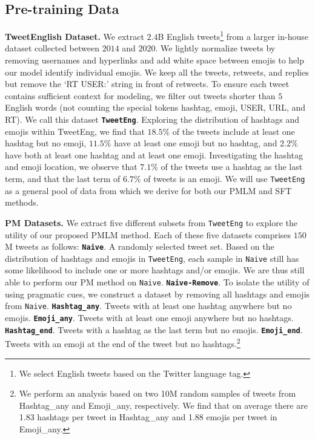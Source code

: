 \subsection{Pre-training Data}
\noindent \textbf{TweetEnglish Dataset.}
We extract $2.4$B English tweets\footnote{We select English tweets based on the Twitter language tag.} from a larger in-house dataset collected between $2014$ and $2020$. We lightly normalize tweets by removing usernames and hyperlinks and add white space between emojis to help our model identify individual emojis. We keep all the tweets, retweets, and replies but remove the `RT USER:' string in front of retweets. To ensure each tweet contains sufficient context for modeling, we filter out tweets shorter than $5$ English words (not counting the special tokens hashtag, emoji, USER, URL, and RT). We call this dataset \textbf{\texttt{TweetEng}}. Exploring the distribution of hashtags and emojis within TweetEng, we find that $18.5$\% of the tweets include at least one hashtag but no emoji, $11.5$\% have at least one emoji but no hashtag, and $2.2$\% have both at least one hashtag and at least one emoji. Investigating the hashtag and emoji location, we observe that $7.1$\% of the tweets use a hashtag as the last term, and that the last term of $6.7$\% of tweets is an emoji. We will use \texttt{TweetEng} as a general pool of data from which we derive for both our PMLM and SFT methods. 

\textbf{PM Datasets.}\label{subsec:prag_masking:data}
We extract five different subsets from \texttt{TweetEng} to explore the utility of our proposed PMLM method. Each of these five datasets comprises $150$M tweets as follows:
\texttt{\textbf{Naive}}. A randomly selected tweet set. Based on the distribution of hashtags and emojis in \texttt{TweetEng}, each sample in \texttt{Naive} still has some likelihood to include one or more hashtags and/or emojis. We are thus still able to perform our PM method on \texttt{Naive}. \texttt{\textbf{Naive-Remove}}. To isolate the utility of using pragmatic cues, we construct a dataset by removing all hashtags and emojis from \texttt{Naive}. \texttt{\textbf{Hashtag\_any}}. Tweets with at least one hashtag anywhere but no emojis. \texttt{\textbf{Emoji\_any}}. Tweets with at least one emoji anywhere but no hashtags. \texttt{\textbf{Hashtag\_end}}. Tweets with a hashtag as the last term but no emojis. \texttt{\textbf{Emoji\_end}}. Tweets with an emoji at the end of the tweet but no hashtags.\footnote{We perform an analysis based on two 10M random samples of tweets from Hashtag\_any and Emoji\_any, respectively. We find that on average there are 1.83 hashtags per tweet in Hashtag\_any and 1.88 emojis per tweet in Emoji\_any.}

